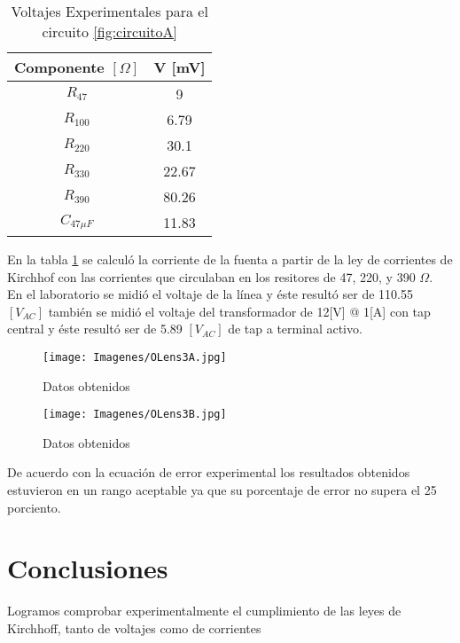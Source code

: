 \documentclass{article}
\begin{document}
\begin{table}[h!]
\centering

\begin{tabular}{|c|c|}
\hline
Componente $[\Omega]$& V [mV] \\ \hline
$R_{47}$         &   9    \\ \hline
$R_{100}$        &  6.79  \\ \hline
$R_{220}$        &  30.1  \\ \hline
$R_{330}$        &  22.67 \\ \hline
$R_{390}$        &  80.26 \\ \hline
$C_{47 \mu F}$      &  11.83        \\ \hline
\end{tabular}

\caption{Voltajes Experimentales para el circuito \ref{fig:circuitoA}}
\label{tabla-experimentales}
\end{table}




En la tabla \ref{tabla-experimentales} se calculó la corriente de la fuenta a partir de la ley de corrientes de Kirchhof con las corrientes que circulaban en los resitores de 47, 220, y 390 $\Omega$.\\

En el laboratorio se midió el voltaje de la línea y éste resultó ser de 110.55 $[V_{AC}]$ también se midió el voltaje del transformador de 12[V] @ 1[A] con tap central y éste resultó ser de 5.89 $[V_{AC}]$ de tap a terminal activo.\\

\begin{figure}[h!]
    \centering
    \texttt{[image: Imagenes/OLens3A.jpg]}
    \caption{Datos obtenidos}
    \label{fig:hojaFirmadaA}
\end{figure}

\begin{figure}[h!]
    \centering
    \texttt{[image: Imagenes/OLens3B.jpg]}
    \caption{Datos obtenidos}
    \label{fig:hojaFirmadaB}
\end{figure}

De acuerdo con la ecuación de error experimental los resultados obtenidos estuvieron en un rango aceptable ya que su porcentaje de error no supera el 25 porciento.\\

\section{Conclusiones}
Logramos comprobar experimentalmente el cumplimiento de las leyes de Kirchhoff, tanto de voltajes como de corrientes




\end{document}
